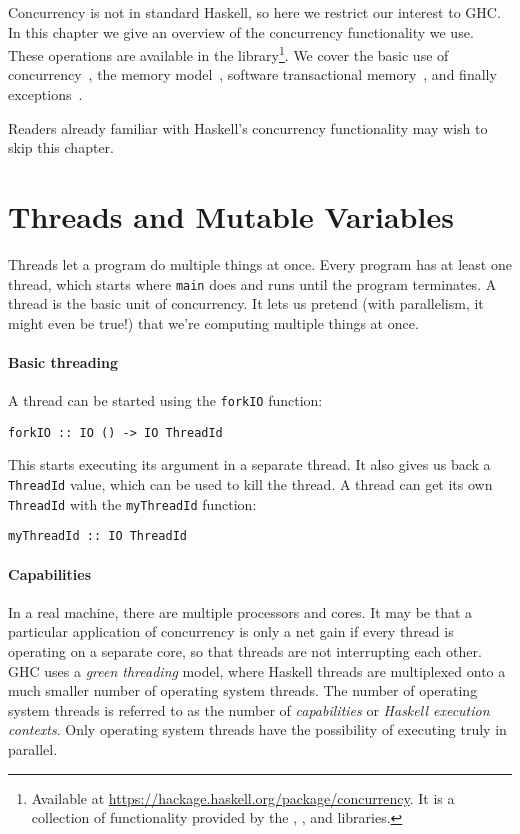 \chapstart Concurrency is not in standard Haskell, so here we restrict our
interest to GHC.  In this chapter we give an overview of the concurrency
functionality we use.  These operations are available in the
 library\footnote{Available at
\url{https://hackage.haskell.org/package/concurrency}.  It is a collection of
functionality provided by the , , and
 libraries.}.  We cover the basic use of
concurrency~, the memory
model~, software transactional
memory~, and finally
exceptions~.

Readers already familiar with Haskell's concurrency functionality may wish to
skip this chapter.

\section{Threads and Mutable Variables}
\label{sec:concurrent_haskell-threads}

Threads let a program do multiple things at once.  Every program has at least
one thread, which starts where \verb|main| does and runs until the program
terminates.  A thread is the basic unit of concurrency.  It lets us pretend
(with parallelism, it might even be true!) that we're computing multiple things
at once.

\paragraph{Basic threading}
A thread can be started using the \verb|forkIO| function:

\begin{verbatim}
forkIO :: IO () -> IO ThreadId
\end{verbatim}

This starts executing its argument in a separate thread.  It also gives us back
a \verb|ThreadId| value, which can be used to kill the thread.  A thread can get
its own \verb|ThreadId| with the \verb|myThreadId| function:

\begin{verbatim}
myThreadId :: IO ThreadId
\end{verbatim}

\paragraph{Capabilities}
In a real machine, there are multiple processors and cores.  It may be that a
particular application of concurrency is only a net gain if every thread is
operating on a separate core, so that threads are not interrupting each other.
GHC uses a \emph{green threading} model, where Haskell threads are multiplexed
onto a much smaller number of operating system threads.  The number of operating
system threads is referred to as the number of \emph{capabilities} or
\emph{Haskell execution contexts}.  Only operating system threads have the
possibility of executing truly in parallel.

